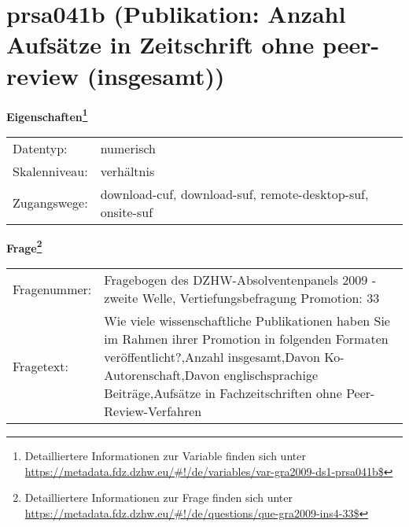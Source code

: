 
    \setcounter{footnote}{0}

    \vspace*{-1.8cm}
	\section{prsa041b (Publikation: Anzahl Aufsätze in Zeitschrift ohne peer-review (insgesamt))}
	\label{section:prsa041b}



    \vspace*{0.5cm}
    \noindent\textbf{Eigenschaften\footnote{Detailliertere Informationen zur Variable finden sich unter
		\url{https://metadata.fdz.dzhw.eu/\#!/de/variables/var-gra2009-ds1-prsa041b$}}}\\
	\begin{tabularx}{\hsize}{@{}lX}
	Datentyp: & numerisch \\
	Skalenniveau: & verhältnis \\
	Zugangswege: &
	  download-cuf, 
	  download-suf, 
	  remote-desktop-suf, 
	  onsite-suf
 \\
    \end{tabularx}



				\vspace*{0.5cm}
                \noindent\textbf{Frage\footnote{Detailliertere Informationen zur Frage finden sich unter
		              \url{https://metadata.fdz.dzhw.eu/\#!/de/questions/que-gra2009-ins4-33$}}}\\
				\begin{tabularx}{\hsize}{@{}lX}
					Fragenummer: &
					  Fragebogen des DZHW-Absolventenpanels 2009 - zweite Welle, Vertiefungsbefragung Promotion:
					  33
 \\
					Fragetext: & Wie viele wissenschaftliche Publikationen haben Sie im Rahmen ihrer Promotion in folgenden Formaten veröffentlicht?,Anzahl insgesamt,Davon Ko-Autorenschaft,Davon englischsprachige Beiträge,Aufsätze in Fachzeitschriften ohne Peer-Review-Verfahren \\
				\end{tabularx}





